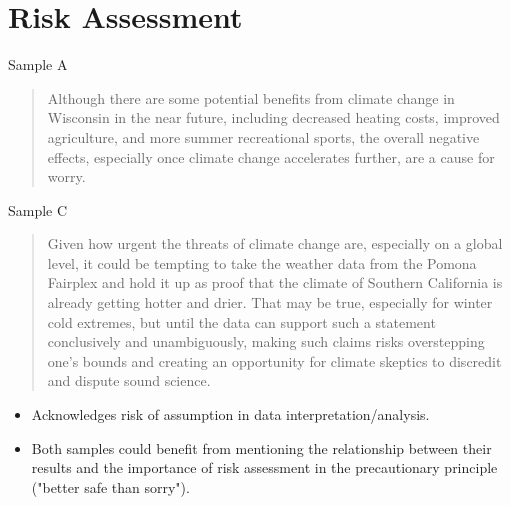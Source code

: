 \documentclass{article}\usepackage[]{graphicx}\usepackage[]{color}
\begin{document}
\section{Risk Assessment}
Sample A
\begin{quote}
Although there are some potential benefits from climate change in Wisconsin in the near future, including decreased heating costs, improved agriculture, and more summer recreational sports, the overall negative effects, especially once climate change accelerates further, are a cause for worry.
\end{quote}

Sample C
\begin{quote}
Given how urgent the threats of climate change are, especially on a global level, it could be tempting to take the weather data from the Pomona Fairplex and hold it up as proof that the climate of Southern California is already getting hotter and drier. That may be true, especially for winter cold extremes, but until the data can support such a statement conclusively and unambiguously, making such claims risks overstepping one’s bounds and creating an opportunity for climate skeptics to discredit and dispute sound science.
\end{quote}
\begin{itemize}
\item Acknowledges risk of assumption in data interpretation/analysis. 
  \item Both samples could benefit from mentioning the relationship between their results and the importance of risk assessment in the precautionary principle ("better safe than sorry"). 
\end{itemize}
\end{document}
